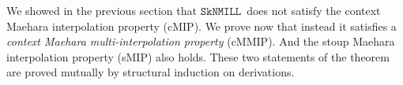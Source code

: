 \documentclass[sn-mathphys-num]{sn-jnl}%
\newcommand{\GG}{\Gamma}
\newcommand{\GD}{\Delta}
\newcommand{\vd}{\vdash}
\newcommand{\SkNMILL}{$\mathtt{SkNMILL}$}
\newcommand{\mf}[1]{\mathsf{#1}}
\newcommand{\gs}[1]{\sigma_{X} (#1)}
\newcommand{\vars}[1]{\mf{var} (#1)}
\newcommand{\sMIP}{\textsf{sMIP}}
\newcommand{\cMIP}{\textsf{cMIP}}
\newcommand{\cMMIP}{\textsf{cMMIP}}
\theoremstyle{thmstyleone}%
\newtheorem{theorem}{Theorem}%
\theoremstyle{thmstyletwo}%
\theoremstyle{thmstylethree}%
\begin{document}

We showed in the previous section that \SkNMILL~does not satisfy the context Maehara interpolation property (\cMIP). 
We prove now that instead it satisfies a \emph{context Maehara multi-interpolation property} (\cMMIP).
And the stoup Maehara interpolation property (\sMIP) also holds.
\genIntrp
These two statements of the theorem are proved mutually by structural induction on derivations.
\end{document}
